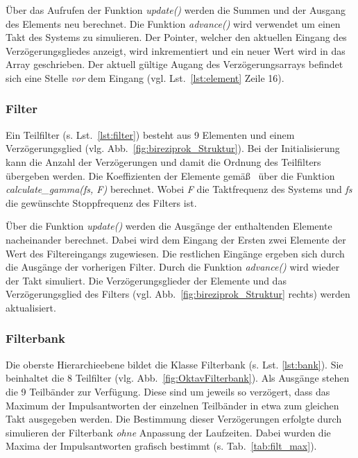 Über das Aufrufen der Funktion \emph{update()} werden die Summen und der Ausgang des Elements neu berechnet. Die Funktion \emph{advance()} wird verwendet um einen Takt des Systems zu simulieren. Der Pointer, welcher den aktuellen Eingang des Verzögerungsgliedes anzeigt, wird inkrementiert und ein neuer Wert wird in das Array geschrieben. Der aktuell gültige Augang des Verzögerungsarrays befindet sich eine Stelle \emph{vor} dem Eingang (vgl. Lst.~\ref{lst:element} Zeile 16).




\subsubsection{Filter}\label{sec:impl_Filter}
Ein Teilfilter (s. Lst.~\ref{lst:filter}) besteht aus 9 Elementen und einem Verzögerungsglied (vlg. Abb.~\ref{fig:bireziprok_Struktur}). Bei der Initialisierung kann die Anzahl der Verzögerungen und damit die Ordnung des Teilfilters übergeben werden. Die Koeffizienten der Elemente gemäß~\cite{gaszi1983} über die Funktion \emph{calculate\_gamma(fs, F)} berechnet. Wobei \emph{F} die Taktfrequenz des Systems und \emph{fs} die gewünschte Stoppfrequenz des Filters ist.

Über die Funktion \emph{update()} werden die Ausgänge der enthaltenden Elemente nacheinander berechnet. Dabei wird dem Eingang der Ersten zwei Elemente der Wert des Filtereingangs zugewiesen. Die restlichen Eingänge ergeben sich durch die Ausgänge der vorherigen Filter. Durch die Funktion \emph{advance()} wird wieder der Takt simuliert. Die Verzögerungsglieder der Elemente und das Verzögerungsglied des Filters (vgl. Abb.~\ref{fig:bireziprok_Struktur} rechts) werden aktualisiert.



\subsubsection{Filterbank}\label{sec:impl_bank}
Die oberste Hierarchieebene bildet die Klasse Filterbank (s. Lst. \ref{lst:bank}). Sie beinhaltet die 8 Teilfilter (vlg. Abb.~\ref{fig:OktavFilterbank}). Als Ausgänge stehen die 9 Teilbänder zur Verfügung. Diese sind um jeweils so verzögert, dass das Maximum der Impulsantworten der einzelnen Teilbänder in etwa zum gleichen Takt ausgegeben werden. Die Bestimmung dieser Verzögerungen erfolgte durch simulieren der Filterbank \emph{ohne} Anpassung der Laufzeiten. Dabei wurden die Maxima der Impulsantworten grafisch bestimmt (s. Tab.~\ref{tab:filt_max}).

